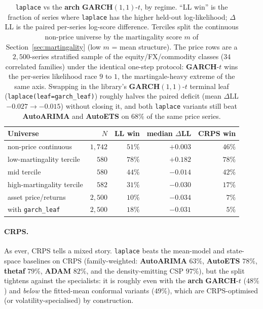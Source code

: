 \documentclass[article]{jss}
\providecommand{\pkg}[1]{\textbf{#1}}
\providecommand{\code}[1]{\texttt{#1}}
\begin{document}
\begin{table}[t!]
\centering
\begin{tabular}{lrrrr}
\toprule
Universe & $N$ & LL win & median $\Delta$LL & CRPS win \\
\midrule
non-price continuous            & $1{,}742$ & $51\%$ & $+0.003$ & $46\%$ \\
\quad low-martingality tercile  & $580$     & $78\%$ & $+0.182$ & $78\%$ \\
\quad mid tercile               & $580$     & $44\%$ & $-0.014$ & $42\%$ \\
\quad high-martingality tercile & $582$     & $31\%$ & $-0.030$ & $17\%$ \\
asset price/returns             & $2{,}500$ & $10\%$ & $-0.034$ & $7\%$  \\
\quad with \code{garch\_leaf}   & $2{,}500$ & $18\%$ & $-0.031$ & $5\%$  \\
\bottomrule
\end{tabular}
\caption{\code{laplace} vs the \pkg{arch} \pkg{GARCH}$(1,1)$-$t$, by regime.
``LL win'' is the fraction of series where \code{laplace} has the higher
held-out log-likelihood; $\Delta$LL is the paired per-series log-score
difference. Terciles split the continuous non-price universe by the
martingality score $m$ of Section~\ref{sec:martingality} (low $m$ = mean
structure). The price rows are a $2{,}500$-series stratified sample of the
equity/FX/commodity classes ($34$ correlated families) under the identical
one-step protocol: \pkg{GARCH}-$t$ wins the per-series likelihood race $9$
to $1$, the martingale-heavy extreme of the same axis. Swapping in the
library's \pkg{GARCH}$(1,1)$-$t$ terminal leaf (\code{laplace(leaf=garch\_leaf)})
roughly halves the paired deficit (mean $\Delta$LL $-0.027 \to -0.015$) without
closing it, and both \code{laplace} variants still beat \pkg{AutoARIMA} and
\pkg{AutoETS} on $68\%$ of the same price series.}
\label{tab:price}
\end{table}

\paragraph{CRPS.}
As ever, CRPS tells a mixed story. \code{laplace} beats the mean-model and
state-space baselines on CRPS (family-weighted: \pkg{AutoARIMA} $63\%$,
\pkg{AutoETS} $78\%$, \pkg{thetaf} $79\%$, \pkg{ADAM} $82\%$, and the
density-emitting CSP $97\%$), but the split tightens against the specialists: it
is roughly even with the \pkg{arch} \pkg{GARCH}-$t$ ($48\%$) and \emph{below} the
fitted-mean conformal variants ($49\%$), which are CRPS-optimised (or
volatility-specialised) by construction.
\end{document}
